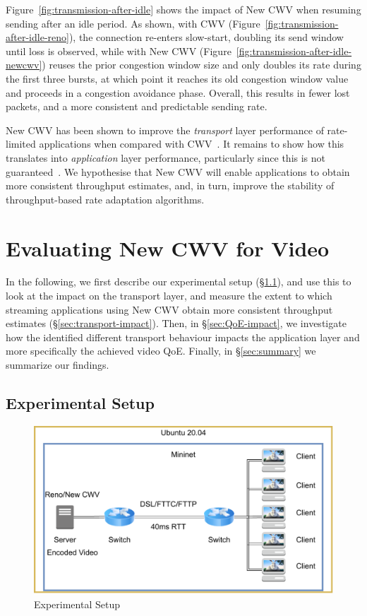 \documentclass[10pt,sigconf,anonymous]{acmart}
\begin{document}
Figure~\ref{fig:transmission-after-idle} shows the impact of New CWV when resuming sending after an idle period. As shown, with CWV (Figure~\ref{fig:transmission-after-idle-reno}), the connection re-enters slow-start, doubling its send window until loss is observed, while with New CWV (Figure~\ref{fig:transmission-after-idle-newcwv}) reuses the prior congestion window size and only doubles its rate during the first three bursts, at which point it reaches its old congestion window value and proceeds in a congestion avoidance phase. Overall, this results in fewer lost packets, and a more consistent and predictable sending rate.

New CWV has been shown to improve the \emph{transport} layer performance of rate-limited applications when compared with CWV~\cite{Nazir-2014-performance-evaluation-congestion-window-validation-dash-newcwv}. It remains to show how this translates into \emph{application} layer performance, particularly since this is not guaranteed~\cite{Spiteri-2016-BOLA}. We hypothesise that New CWV will enable applications to obtain more consistent throughput estimates, and, in turn, improve the stability of throughput-based rate adaptation algorithms.

\section{Evaluating New CWV for Video}
\label{sec:evaluation}

In the following, we first describe our experimental setup (§\ref{sec:experimental-setup}), and use this to look at the impact on the transport layer, and measure the extent to which streaming applications using New CWV obtain more consistent throughput estimates (§\ref{sec:transport-impact}). Then, in §\ref{sec:QoE-impact}, we investigate how the identified different transport behaviour impacts the application layer and more specifically the achieved video QoE. Finally, in §\ref{sec:summary} we summarize our findings.


\subsection{Experimental Setup}
\label{sec:experimental-setup}

\begin{figure}
  \centering
  \includegraphics[width=.5\textwidth]{figures/setup.pdf}
  \caption{Experimental Setup}
  \label{fig:experimental-setup}
\end{figure}
\end{document}
